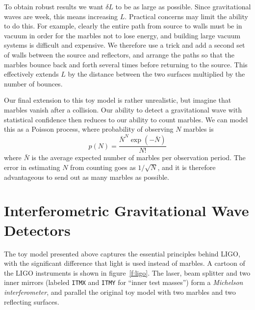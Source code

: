 To obtain robust results we want $\delta L$ to be as large as
possible.  Since gravitational waves are week, this means increasing
$L$.  Practical concerns may limit the ability to do this.  For
example, clearly the entire path from source to walls must be in
vacuum in order for the marbles not to lose energy, and building large
vacuum systems is difficult and expensive.  We therefore use a trick
and add a second set of walls between the source and reflectors, and
arrange the paths so that the marbles bounce back and forth several
times before returning to the source.  This effectively extends $L$ by
the distance between the two surfaces multiplied by the number of
bounces.

Our final extension to this toy model is rather unrealistic, but
imagine that marbles vanish after a collision.  Our ability to detect a
gravitational wave with statistical confidence then reduces to our
ability to count marbles.  We can model this as a Poisson process, where
probability of observing $N$ marbles is 
%
\begin{equation*}
p(N) = \frac{\bar{N}^N \exp(-\bar{N})} {N!}
\end{equation*}
%
where $\bar{N}$ is the average expected number of marbles per
observation period.  The error in estimating $N$ from counting goes as
$1/\sqrt{N}$, and it is therefore advantageous to send out as many 
marbles as possible.

\section{Interferometric Gravitational Wave Detectors}

The toy model presented above captures the essential principles behind
LIGO, with the significant difference that light is used instead of
marbles.  A cartoon of the LIGO instruments is shown in
figure~\ref{f:ligo}.  The laser, beam splitter and two inner mirrors
(labeled \texttt{ITMX} and \texttt{ITMY} for ``inner test masses'')
form a \emph{Michelson interferometer}, and parallel the original toy
model with two marbles and two reflecting surfaces.

